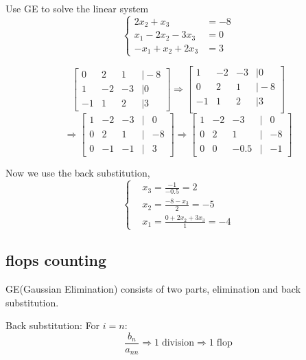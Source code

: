 	\begin{ex}
		Use GE to solve the linear system
		\[ \begin{cases}
		2x_2 + x_3 &= -8\\
		x_1 - 2x_2 - 3x_3 &= 0\\
		-x_1 + x_2 + 2x_3 &= 3
		\end{cases} \]
		\begin{solution}
			\[ \begin{bmatrix}
			0 &2 &1 &\vert-8\\
			1 &-2 &-3 &\vert0\\
			-1 &1 &2 &\vert3
			\end{bmatrix}
			\Rightarrow
			\begin{bmatrix}
			1 &-2& -3 &\vert0\\
			0 &2 &1 &\vert-8\\
			-1& 1& 2&\vert3\\
			\end{bmatrix}
			\]
			\[
			\Rightarrow
			\begin{bmatrix}
			1 &-2& -3 &\vert& 0\\
			0 &2 &1   &\vert&-8\\
			0 &-1& -1 &\vert& 3
			\end{bmatrix}
			\Rightarrow		
			\begin{bmatrix}
			1 &-2& -3   &\vert& 0\\
			0 & 2&  1   &\vert&-8\\
			0 & 0& -0.5 &\vert&-1
			\end{bmatrix}	
			\]
			
			Now we use the back substitution,
			\[\begin{cases}
			&x_3 = \frac{-1}{-0.5} = 2\\
			&x_2 = \frac{-8-x_3}{2} = -5\\
			&x_1 = \frac{0 + 2x_2 + 3x_3}{1} = -4 
			\end{cases}\]
		\end{solution}
	\end{ex}
	
	\subsection{flops counting}
	GE(Gaussian Elimination) consists of two parts, elimination and back substitution.
	
	Back substitution:
	For $i=n$:
	\[\frac{b_n}{a_{nn}} \Rightarrow 1\;\text{division} \Rightarrow 1\;\text{flop}\] 
	
